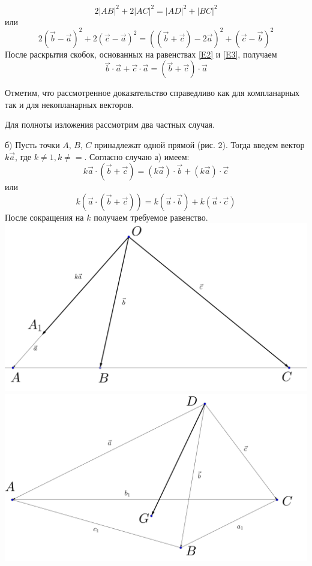 \documentclass{article}
\begin{document}
$$2|AB|^2+2|AC|^2=|AD|^2+|BC|^2$$
или
$$2(\overrightarrow{b}-\overrightarrow{a})^2+2(\overrightarrow{c}-\overrightarrow{a})^2=((\overrightarrow{b}+\overrightarrow{c})-2\overrightarrow{a})^2+(\overrightarrow{c}-\overrightarrow{b})^2$$
После раскрытия скобок, основанных на равенствах \eqref{E2} и \eqref{E3}, получаем
$$\overrightarrow{b}\cdot\overrightarrow{a}+\overrightarrow{c}\cdot\overrightarrow{a}=(\overrightarrow{b}+\overrightarrow{c})\cdot\overrightarrow{a}$$
\par Отметим, что рассмотренное доказательство справедливо как для компланарных так и для некопланарных векторов.
\par Для полноты изложения рассмотрим два частных случая.
\par б) Пусть точки $A$, $B$, $C$ принадлежат одной прямой (рис. 2). Тогда введем вектор $k\overrightarrow{a}$, где $k\neq1,k\neq=$. Согласно случаю а) имеем:
$$k\overrightarrow{a}\cdot(\overrightarrow{b}+\overrightarrow{c})=(k\overrightarrow{a})\cdot\overrightarrow{b}+(k\overrightarrow{a})\cdot\overrightarrow{c}$$
или
$$k(\overrightarrow{a}\cdot(\overrightarrow{b}+\overrightarrow{c}))=k(\overrightarrow{a}\cdot\overrightarrow{b})+k(\overrightarrow{a}\cdot\overrightarrow{c})$$
После сокращения на $k$ получаем требуемое равенство.
\\
\includegraphics[scale=0.12]{grigoriev2.png}
\includegraphics[scale=0.12]{grigoriev3.png}
\end{document}
